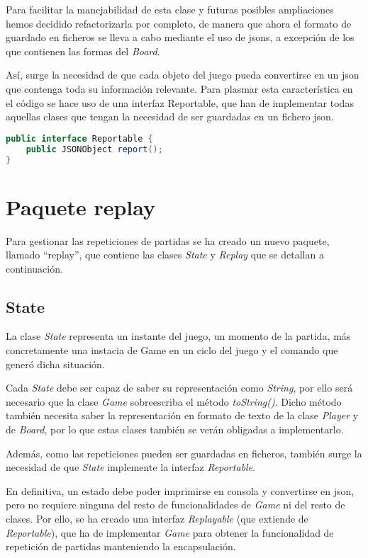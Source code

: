 \documentclass{article}
\begin{document}
Para facilitar la manejabilidad de esta clase y futuras posibles ampliaciones hemos decidido refactorizarla por completo, de manera que ahora el formato de guardado en ficheros se lleva a cabo mediante el uso de jsons, a excepción de los que contienen las formas del \textit{Board}.

Así, surge la necesidad de que cada objeto del juego pueda convertirse en un json que contenga toda su información relevante. Para plasmar esta característica en el código se hace uso de una interfaz Reportable, que han de implementar todas aquellas clases que tengan la necesidad de ser guardadas en un fichero json.

\begin{lstlisting}[frame=single, language=Java]
public interface Reportable {
	public JSONObject report();
}
\end{lstlisting}
\newpage
\section*{Paquete replay}
Para gestionar las repeticiones de partidas se ha creado un nuevo paquete, llamado ``replay'', que contiene las clases \textit{State} y \textit{Replay} que se detallan a continuación.

\subsection*{State}
La clase \textit{State} representa un instante del juego, un momento de la partida, más concretamente una instacia de Game en un ciclo del juego y el comando que generó dicha situación.

Cada \textit{State} debe ser capaz de saber su representación como \textit{String}, por ello será necesario que la clase \textit{Game} sobreescriba el método \textit{toString()}. Dicho método también necesita saber la representación en formato de texto de la clase \textit{Player} y de \textit{Board}, por lo que estas clases también se verán obligadas a implementarlo.

Además, como las repeticiones pueden ser guardadas en ficheros, también surge la necesidad de que \textit{State} implemente la interfaz \textit{Reportable}.

En definitiva, un estado debe poder imprimirse en consola y convertirse en json, pero no requiere ninguna del resto de funcionalidades de \textit{Game} ni del resto de clases. Por ello, se ha creado una interfaz \textit{Replayable} (que extiende de \textit{Reportable}), que ha de implementar \textit{Game} para obtener la funcionalidad de repetición de partidas manteniendo la encapsulación.
\end{document}
